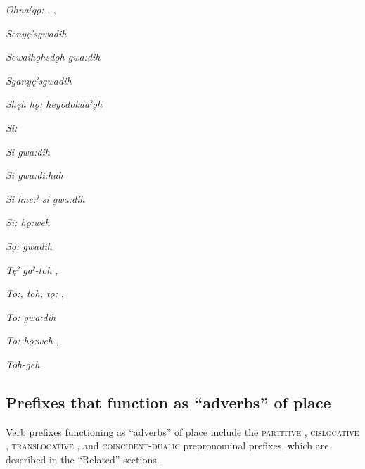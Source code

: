 \begin{CayugaRelated}
\item{} \textit{Ohnaˀgǫ:} , , 

\item{} \textit{Senyęˀsgwadih} 

\item{} \textit{Sewaihǫhsdǫh gwa:dih} 

\item{} \textit{Sganyęˀsgwadih} 

\item{} \textit{Shęh hǫ: heyodokdaˀǫh} 

\item{} \textit{Si:} 

\item{} \textit{Si gwa:dih} 

\item{} \textit{Si gwa:di:hah} 

\item{} \textit{Si hne:ˀ si gwa:dih} 

\item{} \textit{Si: hǫ:weh} 

\item{} \textit{Sǫ: gwadih} 

\item{} \textit{Tęˀ gaˀ-toh} , 

\item{} \textit{To:, toh, tǫ:} , 

\item{} \textit{To: gwa:dih} 

\item{} \textit{To: hǫ:weh} , 

\item{} \textit{Toh-geh} 
\end{CayugaRelated}



\subsection{Prefixes that function as “adverbs” of place} \label{Prefixes and suffixes that function as ‘adverbs’ of place}
Verb prefixes functioning as “adverbs” of place include the \textsc{partitive} , \textsc{cislocative} , \textsc{translocative} , and \textsc{coincident-dualic}  prepronominal prefixes, which are described in the “Related” sections.

